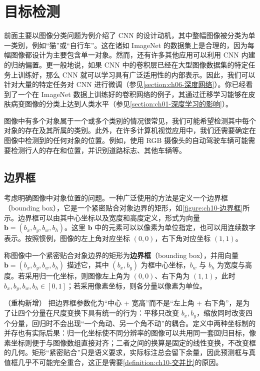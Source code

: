 \documentclass[../../main.tex]{subfiles}
\begin{document}
\section{目标检测}\label{section:ch10-目标检测}

前面主要以图像分类问题为例介绍了 CNN 的设计动机，其中整幅图像被分类为单一类别，例如“猫”或“自行车”。这在诸如 ImageNet 的数据集上是合理的，因为每幅图像都设计为主要包含单一对象。然而，还有许多其他应用可以利用 CNN 内建的归纳偏置。更一般地说，如果 CNN 中的卷积层已经在大型图像数据集的特定任务上训练好，那么 CNN 就可以学习具有广泛适用性的内部表示。因此，我们可以针对大量的特定任务对 CNN 进行微调（参见\cref{section:ch06-深度网络}）。你已经看到了一个在 ImageNet 数据上训练好的卷积网络的例子，其通过迁移学习能够在皮肤病变图像的分类上达到人类水平（参见\cref{section:ch01-深度学习的影响}）。

图像中有多个对象属于一个或多个类别的情况很常见，我们可能希望检测其中每个对象的存在及其所属的类别。此外，在许多计算机视觉应用中，我们还需要确定在图像中检测到的任何对象的位置。例如，使用 RGB 摄像头的自动驾驶车辆可能需要检测行人的存在和位置，并识别道路标志、其他车辆等。

\subsection{边界框}\label{subsection:ch10-边界框}

考虑明确图像中对象位置的问题。一种广泛使用的方法是定义一个边界框（bounding box），它是一个紧密贴合对象边界的矩形，如\cref{figure:ch10-边界框}所示。边界框可以由其中心坐标以及宽度和高度定义，形式为向量 $\mathbf{b}=(b_x,b_y,b_w,b_h)$。这里 $\mathbf{b}$ 中的元素可以以像素为单位指定，也可以用连续数字表示。按照惯例，图像的左上角对应坐标 $(0,0)$，右下角对应坐标 $(1,1)$。

\begin{definition}[边界框]\label{definition:ch10-边界框}
称图像中一个紧密贴合对象边界的矩形为\textbf{边界框}（bounding box），并用向量 $\mathbf{b}=(b_x,b_y,b_w,b_h)$ 描述它，其中 $(b_x,b_y)$ 为框中心坐标，$b_w$ 与 $b_h$ 为宽度与高度。若采用归一化坐标，则图像左上角为 $(0,0)$、右下角为 $(1,1)$，此时 $b_x,b_y,b_w,b_h\in[0,1]$；若采用像素坐标，则各分量以像素为单位。
\end{definition}

\begin{remark}（重构新增）
把边界框参数化为“中心 + 宽高”而不是“左上角 + 右下角”，是为了让四个分量在尺度变换下具有统一的行为：平移只改变 $b_x,b_y$，缩放同时改变四个分量，回归时不会出现“一个角动、另一个角不动”的耦合。定义中两种坐标制的并存也有实际后果：归一化坐标使不同分辨率的图像可以共用同一套回归目标，像素坐标则便于与图像数组直接对齐；二者之间的换算是固定的线性变换，不改变框的几何。矩形“紧密贴合”只是语义要求，实际标注总会留下余量，因此预测框与真值框几乎不可能完全重合，这正是需要\cref{definition:ch10-交并比}的原因。
\end{remark}
\end{document}
